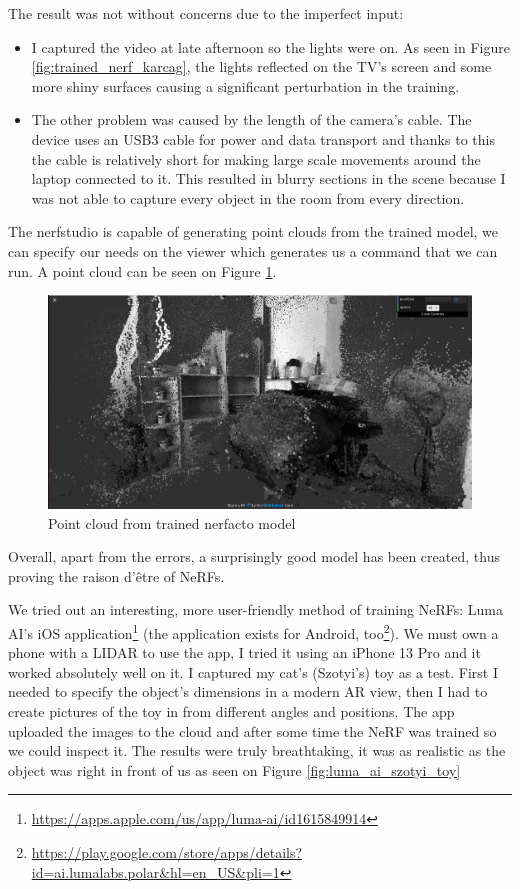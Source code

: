 The result was not without concerns due to the imperfect input:
\begin{itemize}
    \item I captured the video at late afternoon so the lights were on. As seen in Figure \ref{fig:trained_nerf_karcag}, the lights reflected on the TV's screen and some more shiny surfaces causing a significant perturbation in the training.
    \item The other problem was caused by the length of the camera's cable. The device uses an USB3 cable for power and data transport and thanks to this the cable is relatively short for making large scale movements around the laptop connected to it. This resulted in blurry sections in the scene because I was not able to capture every object in the room from every direction.
\end{itemize}

The nerfstudio is capable of generating point clouds from the trained model, we can specify our needs on the viewer which generates us a command that we can run. A point cloud can be seen on Figure \ref{fig:nerfstudio_point_cloud}.

\begin{figure}[H]
	\centering
	\includegraphics[width=150mm, keepaspectratio]{figures/nerfacto_point_cloud1.png}
	\caption{Point cloud from trained nerfacto model}
	\label{fig:nerfstudio_point_cloud}
\end{figure}

Overall, apart from the errors, a surprisingly good model has been created, thus proving the raison d'être of NeRFs.

We tried out an interesting, more user-friendly method of training NeRFs: Luma AI's iOS application\footnote{\url{https://apps.apple.com/us/app/luma-ai/id1615849914}} (the application exists for Android, too\footnote{\url{https://play.google.com/store/apps/details?id=ai.lumalabs.polar&hl=en_US&pli=1}}). We must own a phone with a LIDAR to use the app, I tried it using an iPhone 13 Pro and it worked absolutely well on it. I captured my cat's (Szotyi's) toy as a test. First I needed to specify the object's dimensions in a modern AR view, then I had to create pictures of the toy in from different angles and positions. The app uploaded the images to the cloud and after some time the NeRF was trained so we could inspect it. The results were truly breathtaking, it was as realistic as the object was right in front of us as seen on Figure \ref{fig:luma_ai_szotyi_toy}

